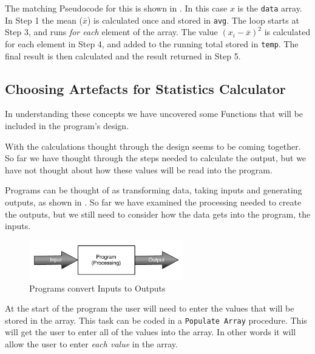 The matching Pseudocode for this is shown in . In this case $x$ is the \texttt{data} array. In Step 1 the mean ($\overline{x}$) is calculated once and stored in \texttt{avg}. The loop starts at Step 3, and runs \emph{for each} element of the array. The value $(x_{i} - \overline{x})^2$ is calculated for each element in Step 4, and added to the running total stored in \texttt{temp}. The final result is then calculated and the result returned in Step 5.




\subsection{Choosing Artefacts for Statistics Calculator} %
\label{sub:choosing_artefacts_for_statistics_calculator}

In understanding these concepts we have uncovered some Functions that will be included in the program's design. 

With the calculations thought through the design seems to be coming together. So far we have thought through the steps needed to calculate the output, but we have not thought about how these values will be read into the program.

Programs can be thought of as transforming data, taking inputs and generating outputs, as shown in . So far we have examined the processing needed to create the outputs, but we still need to consider how the data gets into the program, the inputs.

\begin{figure}[h]
   \centering
   \includegraphics[width=0.6\textwidth]{./topics/arrays/diagrams/ProcessingOverview} 
   \caption{Programs convert Inputs to Outputs}
   \label{fig:input-output-overview}
\end{figure}

At the start of the program the user will need to enter the values that will be stored in the array. This task can be coded in a \texttt{Populate Array} procedure. This will get the user to enter all of the values into the array. In other words it will allow the user to enter \emph{each value} in the array.

